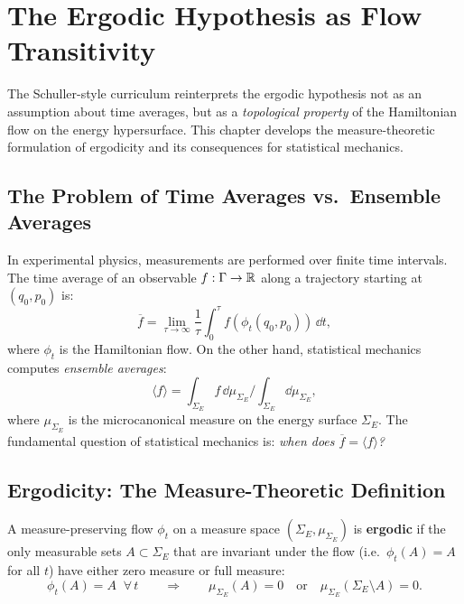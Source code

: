 \chapter{The Ergodic Hypothesis as Flow Transitivity}

The Schuller-style curriculum reinterprets the ergodic hypothesis not as an assumption about time averages, but as a \emph{topological property} of the Hamiltonian flow on the energy hypersurface. This chapter develops the measure-theoretic formulation of ergodicity and its consequences for statistical mechanics.

\section{The Problem of Time Averages vs.\ Ensemble Averages}

In experimental physics, measurements are performed over finite time intervals. The time average of an observable $f: \Gamma \to \mathbb{R}$ along a trajectory starting at $(q_0, p_0)$ is:
\begin{equation}
\overline{f} = \lim_{\tau \to \infty} \frac{1}{\tau}\int_0^\tau f(\phi_t(q_0, p_0))\,\dd t,
\end{equation}
where $\phi_t$ is the Hamiltonian flow. On the other hand, statistical mechanics computes \emph{ensemble averages}:
\begin{equation}
\langle f \rangle = \int_{\Sigma_E} f\,\dd\mu_{\Sigma_E} \bigg/ \int_{\Sigma_E}\dd\mu_{\Sigma_E},
\end{equation}
where $\mu_{\Sigma_E}$ is the microcanonical measure on the energy surface $\Sigma_E$. The fundamental question of statistical mechanics is: \emph{when does $\overline{f} = \langle f \rangle$?}

\section{Ergodicity: The Measure-Theoretic Definition}

\begin{definition}
A measure-preserving flow $\phi_t$ on a measure space $(\Sigma_E, \mu_{\Sigma_E})$ is \textbf{ergodic} if the only measurable sets $A \subset \Sigma_E$ that are invariant under the flow (i.e.\ $\phi_t(A) = A$ for all $t$) have either zero measure or full measure:
\begin{equation}
\phi_t(A) = A \;\;\forall\, t \qquad \Longrightarrow \qquad \mu_{\Sigma_E}(A) = 0 \quad\text{or}\quad \mu_{\Sigma_E}(\Sigma_E \setminus A) = 0.
\end{equation}
\end{definition}

